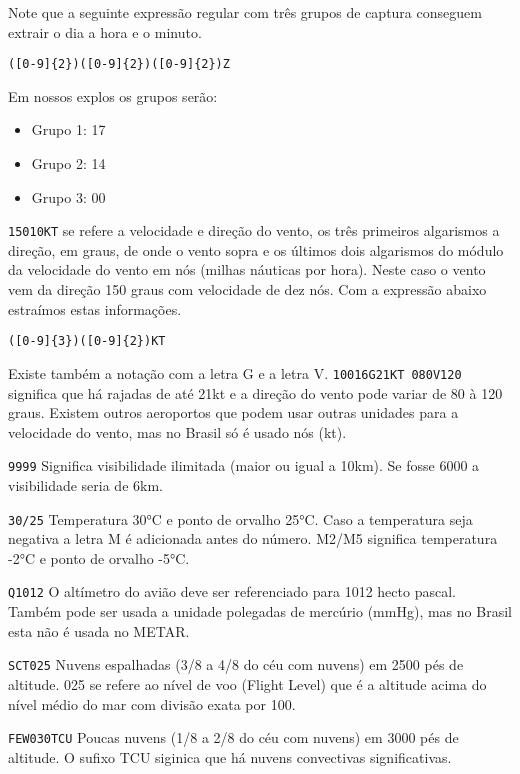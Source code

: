 Note que a seguinte expressão regular com três grupos de captura conseguem extrair o dia a hora e o minuto.

\begin{verbatim}
([0-9]{2})([0-9]{2})([0-9]{2})Z
\end{verbatim}

Em nossos explos os grupos serão: 

\begin{itemize}
  \item Grupo 1: 17
  \item Grupo 2: 14
  \item Grupo 3: 00
\end{itemize}

\texttt{15010KT} se refere a velocidade e direção do vento, os três primeiros algarismos a direção, em graus,
de onde o vento sopra e os últimos dois algarismos do módulo da velocidade do vento em nós (milhas
náuticas por hora). Neste caso o vento vem da direção 150 graus com velocidade de dez nós.
Com a expressão abaixo estraímos estas informações.

\begin{verbatim}
([0-9]{3})([0-9]{2})KT
\end{verbatim}

Existe também a notação com a letra G e a letra V. \texttt{10016G21KT 080V120} significa que há rajadas de
até 21kt e a direção do vento pode variar de 80 à 120 graus. Existem outros aeroportos que podem usar 
outras unidades para a velocidade do vento, mas no Brasil só é usado nós (kt).

\texttt{9999} Significa visibilidade ilimitada (maior ou igual a 10km). Se fosse 6000 a visibilidade 
seria de 6km.

\texttt{30/25} Temperatura 30°C e ponto de orvalho 25°C. Caso a temperatura seja negativa a letra M é adicionada
antes do número. M2/M5 significa temperatura -2°C e ponto de orvalho -5°C. \cite{metar-help}

\texttt{Q1012} O altímetro do avião deve ser referenciado para 1012 hecto pascal. Também pode ser usada
a unidade polegadas de mercúrio (mmHg), mas no Brasil esta não é usada no METAR.

\texttt{SCT025} Nuvens espalhadas (3/8 a 4/8 do céu com nuvens) em 2500 pés de altitude. 025 se refere ao
nível de voo (Flight Level) que é a altitude acima do nível médio do mar com divisão exata por 100.

\texttt{FEW030TCU} Poucas nuvens (1/8 a 2/8 do céu com nuvens) em 3000 pés de altitude. O sufixo TCU siginica que
há nuvens convectivas significativas. \cite {decea-mil}

